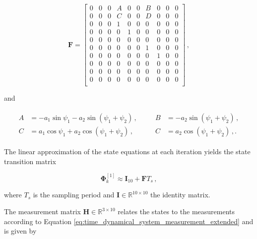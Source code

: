 \begin{equation}
\mathbf{F} = \begin{bmatrix}
  0 & 0 & 0 & A & 0 & 0 & B & 0 & 0 & 0\\
  0 & 0 & 0 & C & 0 & 0 & D & 0 & 0 & 0\\
  0 & 0 & 0 & 1 & 0 & 0 & 0 & 0 & 0 & 0\\
  0 & 0 & 0 & 0 & 1 & 0 & 0 & 0 & 0 & 0\\
  0 & 0 & 0 & 0 & 0 & 0 & 0 & 0 & 0 & 0\\
  0 & 0 & 0 & 0 & 0 & 0 & 1 & 0 & 0 & 0\\
  0 & 0 & 0 & 0 & 0 & 0 & 0 & 1 & 0 & 0\\
  0 & 0 & 0 & 0 & 0 & 0 & 0 & 0 & 0 & 0\\
  0 & 0 & 0 & 0 & 0 & 0 & 0 & 0 & 0 & 0\\
  0 & 0 & 0 & 0 & 0 & 0 & 0 & 0 & 0 & 0\\
\end{bmatrix}\,,
\end{equation}

\noindent
and

\begin{equation*}
  \begin{array}{cc}
  \begin{split}
  	A &= -a_1 \sin \psi_1 -a_2 \sin (\psi_1 + \psi_2)\,, \quad \\
  	C &= a_1 \cos \psi_1 + a_2 \cos (\psi_1 + \psi_2)\,,
  \end{split} &
  \begin{split}
  B &= -a_2 \sin (\psi_1 + \psi_2)\,, \\
  C &= a_2 \cos (\psi_1 + \psi_2)\,,.
  \end{split}
\end{array}
\end{equation*}

\noindent
The linear approximation of the state equations at each iteration yields the state transition matrix

\begin{equation}
  \bm{\Phi}^{[1]}_{k} \approx \mathbf{I}_{10} + \mathbf{F} T_s\,,
\end{equation}

\noindent
where $T_s$ is the sampling period and $\mathbf{I} \in \mathbb{R}^{10 \times 10}$ the identity matrix.

The measurement matrix $\mathbf{H} \in \mathbb{R}^{3 \times 10}$ relates the states to the measurements according to Equation \ref{eq:time_dynamical_system_measurement_extended} and is given by 


